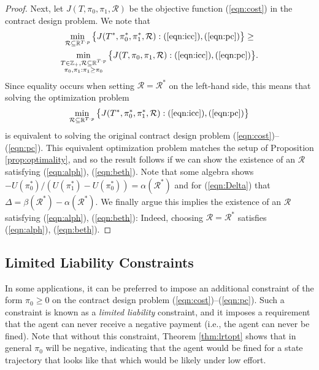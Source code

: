 \documentclass[letterpaper, 10 pt, conference]{ieeeconf}  %
\begin{document}
\begin{proof}
Next, let $J(T,\pi_0,\pi_1,\mathcal{R})$ be the objective function (\ref{eqn:cost}) in the contract design problem. We note that
\begin{multline}
    \min_{\mathcal{R}\subseteq\mathbb{R}^{T\cdot p}} \big\{J(T^*,\pi_0^*,\pi_1^*,\mathcal{R}) : (\ref{eqn:icc}), (\ref{eqn:pc}) \big\} \geq \\
\min_{\substack{T\in\mathbb{Z}_+, \mathcal{R}\subseteq\mathbb{R}^{T\cdot p}\\\pi_0,\pi_1 : \pi_1 \geq \pi_0}} \big\{J(T,\pi_0,\pi_1,\mathcal{R}) : (\ref{eqn:icc}), (\ref{eqn:pc})\big\}.
\end{multline}
Since equality occurs when setting $\mathcal{R} = \mathcal{R}^*$ on the left-hand side, this means that solving the optimization problem
\begin{equation}
    \min_{\mathcal{R}\subseteq\mathbb{R}^{T\cdot p}} \big\{J(T^*,\pi_0^*,\pi_1^*,\mathcal{R}) : (\ref{eqn:icc}), (\ref{eqn:pc}) \big\}
\end{equation}
is equivalent to solving the original contract design problem (\ref{eqn:cost})--(\ref{eqn:pc}). This equivalent optimization problem matches the setup of Proposition \ref{prop:optimality}, and so the result follows if we can show the existence of an $\mathcal{R}$ satisfying (\ref{eqn:alph}), (\ref{eqn:beth}). Note that some algebra shows $- U(\pi_0^*)/(U(\pi_1^*)-U(\pi_0^*)) = \alpha(\mathcal{R}^*)$
and for (\ref{eqn:Delta}) that $\Delta = \beta(\mathcal{R}^*) - \alpha(\mathcal{R}^*)$. We finally argue this implies the existence of an $\mathcal{R}$ satisfying (\ref{eqn:alph}), (\ref{eqn:beth}): Indeed, choosing $\mathcal{R} = \mathcal{R}^*$ satisfies (\ref{eqn:alph}), (\ref{eqn:beth}).
\end{proof}

\subsection{Limited Liability Constraints}
In some applications, it can be preferred to impose an additional constraint of the form $\pi_0 \geq 0$ on the contract design problem (\ref{eqn:cost})--(\ref{eqn:pc}). Such a constraint is known as a \emph{limited liability} constraint, and it imposes a requirement that the agent can never receive a negative payment (i.e., the agent can never be fined). Note that without this constraint, Theorem \ref{thm:lrtopt} shows that in general $\pi_0$ will be negative, indicating that the agent would be fined for a state trajectory that looks like that which would be likely under low effort.
\end{document}
